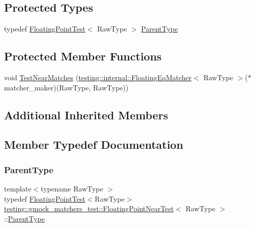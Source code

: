 \subsection*{Protected Types}
\begin{DoxyCompactItemize}
\item 
typedef \hyperlink{classtesting_1_1gmock__matchers__test_1_1_floating_point_test}{Floating\+Point\+Test}$<$ Raw\+Type $>$ \hyperlink{classtesting_1_1gmock__matchers__test_1_1_floating_point_near_test_ac767d2bf3e518d1e7cf9dfafc76cc53a}{Parent\+Type}
\end{DoxyCompactItemize}
\subsection*{Protected Member Functions}
\begin{DoxyCompactItemize}
\item 
void \hyperlink{classtesting_1_1gmock__matchers__test_1_1_floating_point_near_test_a712b564197ab76f58d345c5e3e73955d}{Test\+Near\+Matches} (\hyperlink{classtesting_1_1internal_1_1_floating_eq_matcher}{testing\+::internal\+::\+Floating\+Eq\+Matcher}$<$ Raw\+Type $>$($\ast$matcher\+\_\+maker)(Raw\+Type, Raw\+Type))
\end{DoxyCompactItemize}
\subsection*{Additional Inherited Members}


\subsection{Member Typedef Documentation}
\mbox{\label{classtesting_1_1gmock__matchers__test_1_1_floating_point_near_test_ac767d2bf3e518d1e7cf9dfafc76cc53a}} 
\subsubsection{\texorpdfstring{Parent\+Type}{ParentType}}
{\footnotesize\ttfamily template$<$typename Raw\+Type $>$ \\
typedef \hyperlink{classtesting_1_1gmock__matchers__test_1_1_floating_point_test}{Floating\+Point\+Test}$<$Raw\+Type$>$ \hyperlink{classtesting_1_1gmock__matchers__test_1_1_floating_point_near_test}{testing\+::gmock\+\_\+matchers\+\_\+test\+::\+Floating\+Point\+Near\+Test}$<$ Raw\+Type $>$\+::\hyperlink{classtesting_1_1gmock__matchers__test_1_1_floating_point_near_test_ac767d2bf3e518d1e7cf9dfafc76cc53a}{Parent\+Type}\hspace{0.3cm}{\ttfamily [protected]}}



